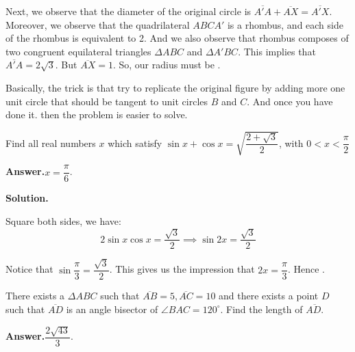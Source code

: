 \documentclass[12pt,paper=letter]{scrartcl}
\newcommand{\ans}[1]{{\sffamily \bfseries Answer.}\;\(\boxed{\text{#1}}\).}
\newcommand{\sol}{{\sffamily \bfseries Solution.}\;}
\newenvironment{rem}%
{\noindent \ignorespaces \small \sffamily \sansmath {\bfseries Remark.}}%
{\ignorespacesafterend}
\begin{document}
\vspace{2mm}

Next, we observe that the diameter of the original circle is $\overline{A'A} +  \overline{AX} = \overline{A'X}$. Moreover, we observe that the quadrilateral $ABCA'$ is a rhombus, and each side of the rhombus is equivalent to 2. And we also observe that rhombus composes of two congruent equilateral triangles $\Delta ABC$ and $\Delta A'BC.$ This implies that $\overline{A'A} = 2\sqrt{3}$. But $\overline{AX} = 1$. So, our radius must be .

\begin{rem}
Basically, the trick is that try to replicate the original figure by adding more one unit circle that should be tangent to unit circles $B$ and $C$. And once you have done it. then the problem is easier to solve.
\end{rem}

\newpage


\begin{probboxed}
Find all real numbers $x$ which satisfy $\sin x + \cos x =\sqrt{\dfrac{2 + \sqrt3}{2}}$, with $0 < x < \dfrac{\pi}{2}$
\end{probboxed}

\ans{$x=\dfrac{\pi}{6}$}

\sol

Square both sides, we have: $$2\sin x \cos x = \dfrac{\sqrt{3}}{2} \implies \sin 2x = \dfrac{\sqrt{3}}{2}$$

Notice that $\sin \dfrac{\pi}{3} = \dfrac{\sqrt{3}}{2} $. This gives us the impression that $2x = \dfrac{\pi}{3} $. Hence .

\begin{probboxed}
There exists a $\Delta ABC$ such that $\overline{AB}=5, \overline{AC} =10$ and there exists a point $D$ such that $\overline{AD}$ is an angle bisector of $\angle BAC = 120^{\circ}$. Find the length of $\overline{AD.}$
\end{probboxed}

\ans{$\dfrac{2\sqrt{43}}{3}$}
\end{document}
